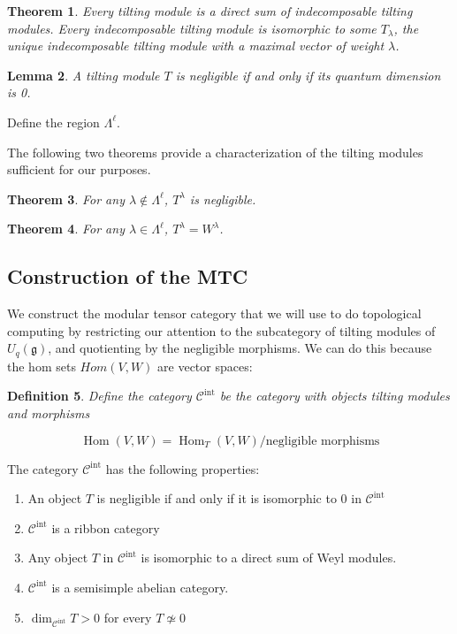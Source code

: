 \documentclass[]{article}
\newtheorem{theorem}{Theorem}[subsection]
\newtheorem{defn}[theorem]{Definition}
\newtheorem{lemma}[theorem]{Lemma}
\newcommand{\Hom}{\operatorname{Hom}}
\numberwithin{equation}{subsection}
\begin{document}
\begin{theorem}
    Every tilting module is a direct sum of indecomposable tilting modules.
    Every indecomposable tilting module is isomorphic to some $T_\lambda$, the
    unique indecomposable tilting module with a maximal vector of weight
    $\lambda$.
\end{theorem}



\begin{lemma}
    A tilting module $T$ is negligible if and only if its quantum dimension is 0.
\end{lemma}

Define the region $\Lambda^\ell$.

The following two theorems provide a characterization of the tilting modules sufficient for our purposes.

\begin{theorem}
For any $\lambda \notin \Lambda^\ell$, $T^\lambda$ is negligible. 
\end{theorem}

\begin{theorem}
For any $\lambda \in \Lambda^\ell$, $T^\lambda = W^\lambda$.
\end{theorem}



\subsection{Construction of the MTC}

We construct the modular tensor category that we will use to do topological
computing by restricting our attention to the subcategory of tilting modules of
$U_q(\mathfrak{g})$, and quotienting by the negligible morphisms. We can do
this because the hom sets $Hom(V,W)$ are vector spaces:

\begin{defn}
    Define the category $\mathcal{C}^\text{int}$ be the category with objects tilting modules and morphisms 

    \begin{equation*}
        \Hom(V,W) = \Hom_T(V,W) / \text{negligible morphisms}
    \end{equation*}

\end{defn}

The category $\mathcal{C}^\text{int}$ has the following properties:
\begin{enumerate}
    \item An object $T$ is negligible if and only if it is isomorphic to 0 in $\mathcal{C}^\text{int}$
    \item  $\mathcal{C}^\text{int}$ is a ribbon category
    \item Any object $T$ in $\mathcal{C}^\text{int}$ is isomorphic to a direct sum of Weyl modules.
    \item $\mathcal{C}^\text{int}$ is a semisimple abelian category. 
    \item $\dim_{\mathcal{C}^\text{int}} T > 0$ for every $T \not\simeq 0$
\end{enumerate}
\end{document}
